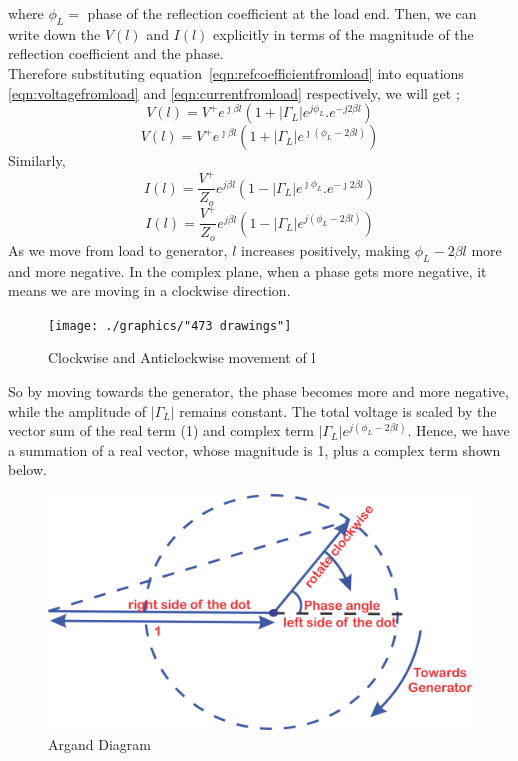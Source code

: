 where $\phi_L =$ phase of the reflection coefficient at the load end. Then, we can write down the $V(l)$ and $I(l)$ explicitly in terms of the magnitude of the reflection coefficient and the phase.\\
Therefore substituting equation~\ref{eqn:refcoefficientfromload} into equations \ref{eqn:voltagefromload} and \ref{eqn:currentfromload} respectively, we will get ;
\begin{equation*}
V(l) = V^{+}e^{\jmath\beta l}(1 + |\Gamma_L|e^{j\phi_L} . e^{-j 2 \beta l})
\end{equation*}
\begin{equation}
V(l) = V^{+}e^{\jmath\beta l}(1 + |\Gamma_L|  e^{\jmath(\phi_L -2 \beta l)})
\end{equation}
Similarly,
\begin{equation*}
I(l) = \frac{V^+}{Z_o}e ^{j \beta l}( 1 - |\Gamma_L|e^{\jmath\phi_L} . e^{-\jmath 2\beta l})
\end{equation*}
\begin{equation}
I(l) = \frac{V^+}{Z_o}e ^{j \beta l}( 1 -|\Gamma_L|  e^{j(\phi_L -2 \beta l)})
\end{equation}
As we move from load to generator, $l$ increases positively, making $\phi_L -2 \beta l$ more and more negative. In the complex plane, when a phase gets more negative, it means we are moving in a clockwise direction.
\begin{figure}[h]
\centering
\texttt{[image: ./graphics/"473 drawings"]}
\caption{Clockwise and Anticlockwise movement of l}
\label{fig:473-drawings}
\end{figure}

So by moving towards the generator, the phase becomes more and more negative, while the amplitude of $|\Gamma_L|$ remains constant. The total voltage is scaled by the vector sum of the real term (1) and complex term $|\Gamma_L|  e^{j(\phi_L -2 \beta l)}$. Hence, we have a summation of a real vector, whose magnitude is 1, plus a complex term shown below. 
\begin{figure}[h]
\centering
\includegraphics[width=0.6\linewidth]{./graphics/kjhgfdwert}
\caption{Argand Diagram}
\label{fig:kjhgfdwert}
\end{figure}

